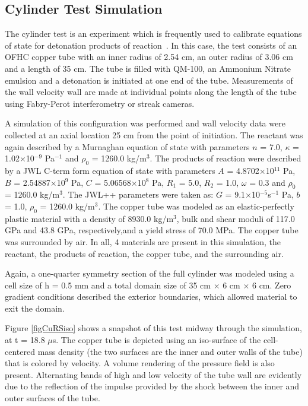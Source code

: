 \subsection{Cylinder Test Simulation}

The cylinder test is an experiment which is frequently used to calibrate 
equations of state for detonation products of 
reaction~\cite{Souers2001CylinderTest}.  In this case, the test consists of an OFHC
copper tube with an inner radius of 2.54 cm, an outer radius of 3.06 cm and 
a length of 35 cm.  The tube is filled with QM-100, an Ammonium Nitrate 
emulsion and a detonation is initiated at one end of the tube.  Measurements
of the wall velocity wall are made at individual points along the length of 
the tube using Fabry-Perot interferometry or streak cameras.

A simulation of this configuration was performed and wall velocity data were 
collected at an axial location 25 cm from the point of initiation.  The 
reactant was again described by a Murnaghan equation of state with parameters 
$n$ = 7.0, $\kappa$ = 1.02$\times$10$^{-9}$ Pa$^{-1}$ and $\rho_0$ = 1260.0 kg/m$^3$.  The products 
of reaction were described by a JWL C-term form  equation of state with 
parameters $A$ = 4.8702$\times$10$^{11}$ Pa, $B$ = 2.54887$\times$10$^9$ Pa, $C$ = 5.06568$\times$10$^8$ Pa, 
$R_1$ = 5.0, $R_2$ = 1.0, $\omega$ = 0.3 and $\rho_0$ = 1260.0 kg/m$^3$.
The JWL++ parameters were taken as: $G$ = 9.1$\times$10$^{-5}$s$^{-1}$ Pa, $b$ = 1.0,
$\rho_0$ = 1260.0 kg/m$^3$.  The copper tube was modeled as an elastic-perfectly 
plastic material with a density of 8930.0 kg/m$^3$, bulk and shear moduli of 
117.0 GPa and 43.8 GPa, respectively,and a yield stress of 70.0 MPa.
The copper tube was surrounded by air.  In all, 4 materials are present in
this simulation, the reactant, the products of reaction, the copper tube, and 
the surrounding air.

Again, a one-quarter symmetry section of the full cylinder was modeled using 
a cell size of h = 0.5 mm and a total domain size of 
35 cm $\times$ 6 cm $\times$ 6 cm.  Zero gradient conditions described the 
exterior boundaries, which allowed material to exit the domain.

Figure \ref{figCuRSiso} shows a snapshot of this test midway through the 
simulation, at t = 18.8 $\mu$s.  The copper tube is depicted using an 
iso-surface of the cell-centered mass density (the two surfaces are the 
inner and outer walls of the tube) that is colored by velocity.  A volume 
rendering of the pressure field is also present.  Alternating bands of high 
and low velocity of the tube wall are evidently due to the reflection of the 
impulse provided by the shock between the inner and outer surfaces of the tube.

